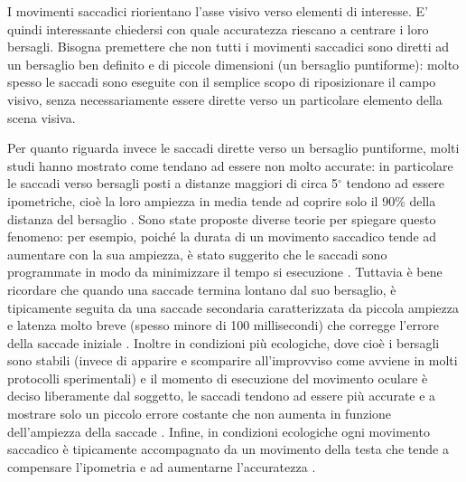 \documentclass[12pt]{article}
\begin{document}
I movimenti saccadici riorientano l'asse visivo verso elementi di interesse. E' quindi interessante chiedersi con quale accuratezza riescano a centrare i loro bersagli. Bisogna premettere che non tutti i movimenti saccadici sono diretti ad un bersaglio ben definito e di piccole dimensioni (un bersaglio puntiforme): molto spesso le saccadi sono eseguite con il semplice scopo di riposizionare il campo visivo, senza necessariamente essere dirette verso un particolare elemento della scena visiva. 

Per quanto riguarda invece le saccadi dirette verso un bersaglio puntiforme, molti studi hanno mostrato come tendano ad essere non molto accurate: in particolare le saccadi verso bersagli posti a distanze maggiori di circa 5$^{\circ}$ tendono ad essere ipometriche, cioè la loro ampiezza in media tende ad coprire solo il 90\% della distanza del bersaglio \cite{Becker1972}. Sono state proposte diverse teorie per spiegare questo fenomeno: per esempio, poiché la durata di un movimento saccadico tende ad aumentare con la sua ampiezza, è stato suggerito che le saccadi sono programmate in modo da minimizzare il tempo si esecuzione \cite{Harris1995}. Tuttavia è bene ricordare che quando una saccade termina lontano dal suo bersaglio, è tipicamente seguita da una saccade secondaria caratterizzata da piccola ampiezza e latenza molto breve (spesso minore di 100 millisecondi) che corregge l'errore della saccade iniziale \cite{Jacobs1987}. Inoltre in condizioni più ecologiche, dove cioè i bersagli sono stabili (invece di apparire e scomparire all'improvviso come avviene in molti protocolli sperimentali) e il momento di esecuzione del movimento oculare è deciso liberamente dal soggetto, le saccadi tendono ad essere più accurate e a mostrare solo un piccolo errore costante che non aumenta in funzione dell'ampiezza della saccade \cite{Collewijn1988}. Infine, in condizioni ecologiche ogni movimento saccadico è tipicamente accompagnato da un movimento della testa che tende a compensare l'ipometria e ad aumentarne l'accuratezza \cite{Guitton1987}.
\end{document}
